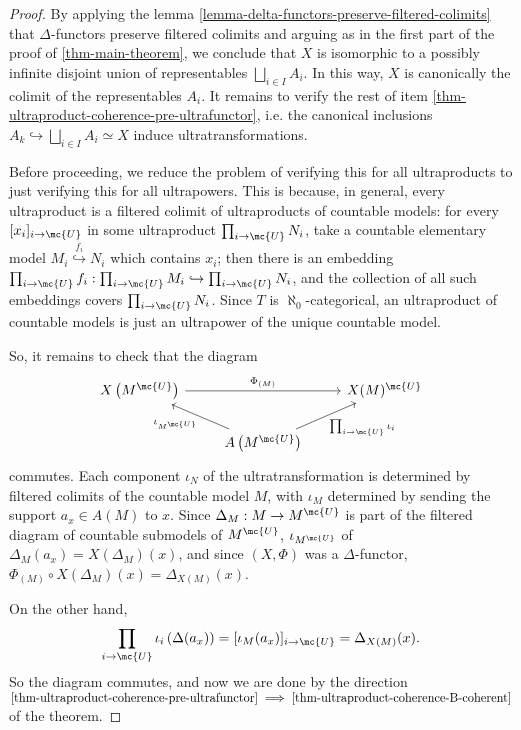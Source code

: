 \begin{proof}
  By applying the lemma \ref{lemma-delta-functors-preserve-filtered-colimits} that $\Delta$-functors preserve filtered colimits and arguing as in the first part of the proof of \ref{thm-main-theorem}, we conclude that $X$ is isomorphic to a possibly infinite disjoint union of representables $\bigsqcup_{i \in I} A_i$. In this way, $X$ is canonically the colimit of the representables $A_i$. It remains to verify the rest of item \ref{thm-ultraproduct-coherence-pre-ultrafunctor}, i.e. the canonical inclusions $A_k \hookrightarrow \bigsqcup_{i \in I} A_i \simeq X$ induce ultratransformations.

  Before proceeding, we reduce the problem of verifying this for all ultraproducts to just verifying this for all ultrapowers. This is because, in general, every ultraproduct is a filtered colimit of ultraproducts of countable models: for every $[x_i]_{i \to \mc{U}}$ in some ultraproduct $\prod_{i \to \mc{U}} N_i$, take a countable elementary model $M_i \overset{f_i}{\hookrightarrow} N_i$ which contains $x_i$; then there is an embedding $\prod_{i \to \mc{U}} f_i : \prod_{i \to \mc{U}} M_i \hookrightarrow \prod_{i \to \mc{U}} N_i$, and the collection of all such embeddings covers $\prod_{i \to \mc{U}} N_i$. Since $T$ is $\aleph_0$-categorical, an ultraproduct of countable models is just an ultrapower of the unique countable model.

  So, it remains to check that the diagram
  $$
  \begin{tikzcd}[ampersand replacement = \&]
X\left(M^{\mc{U}} \right) \arrow{rr}{\Phi_{(M)}}    \& \& X(M)^{\mc{U}}\\
    \& \arrow{ul}{\iota_{M^{\mc{U}}}} \arrow[swap]{ur}{\prod_{i \to \mc{U}} \iota_i}  A\left(M^{\mc{U}} \right) \&
    \end{tikzcd}
  $$
  commutes. Each component $\iota_N$ of the ultratransformation is determined by filtered colimits of the countable model $M$, with $\iota_M$ determined by sending the support $a_x \in A(M)$ to $x$. Since $\Delta_M : M \to M^{\mc{U}}$ is part of the filtered diagram of countable submodels of $M^{\mc{U}}$, $\iota_{M^{\mc{U}}}$ of $\Delta_M(a_x) = X(\Delta_M)(x)$, and since $(X, \Phi)$ was a $\Delta$-functor, $\Phi_{(M)} \circ X(\Delta_M)(x) = \Delta_{X(M)}(x)$.

  On the other hand, $$\prod_{i \to \mc{U}} \iota_i \left(\Delta(a_x)\right) = [\iota_M(a_x)]_{i \to \mc{U}} = \Delta_{X(M)}(x).$$ So the diagram commutes, and now we are done by the direction $\ref{thm-ultraproduct-coherence-pre-ultrafunctor} \implies \ref{thm-ultraproduct-coherence-B-coherent}$ of the theorem.
\end{proof}

